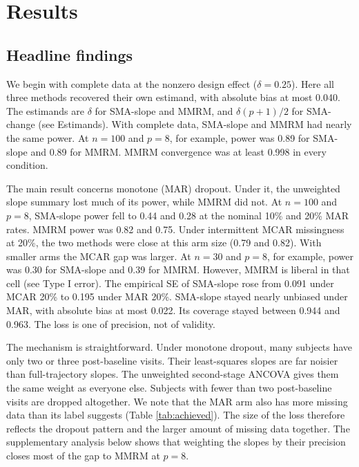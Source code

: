 \documentclass[
  11pt,
]{article}
\begin{document}
\section{Results}\label{results}

\subsection{Headline findings}\label{headline-findings}

We begin with complete data at the nonzero design effect
(\(\delta = 0.25\)). Here all three methods recovered their own
estimand, with absolute bias at most
0.040. The estimands
are \(\delta\) for SMA-slope and MMRM, and \(\delta (p+1)/2\) for
SMA-change (see Estimands). With complete data, SMA-slope and
MMRM had nearly the same power. At \(n = 100\) and \(p = 8\), for
example, power was 0.89 for SMA-slope and
0.89 for MMRM. MMRM convergence was at least
0.998 in every condition.

The main result concerns monotone (MAR) dropout. Under it, the
unweighted slope summary lost much of its power, while MMRM
did not. At \(n = 100\) and \(p = 8\), SMA-slope power fell to
0.44 and 0.28
at the nominal 10\% and 20\% MAR rates. MMRM power was
0.82 and 0.75. Under
intermittent MCAR missingness at 20\%, the two methods were
close at this arm size (0.79 and
0.82). With smaller arms the MCAR gap was
larger. At \(n = 30\) and \(p = 8\), for example, power was
0.30 for SMA-slope and 0.39 for MMRM.
However, MMRM is liberal in that cell (see Type I error). The
empirical SE of SMA-slope rose
from 0.091 under MCAR 20\% to
0.195 under MAR 20\%. SMA-slope stayed
nearly unbiased under MAR, with absolute bias at most
0.022. Its coverage
stayed between 0.944 and
0.963. The loss is one of
precision, not of validity.

The mechanism is straightforward. Under monotone dropout, many
subjects have only two or three post-baseline visits. Their
least-squares slopes are far noisier than full-trajectory
slopes. The unweighted second-stage ANCOVA gives them the same
weight as everyone else. Subjects with fewer than two
post-baseline visits are dropped altogether. We note that the
MAR arm also has more missing data than its label suggests
(Table \ref{tab:achieved}). The size of the loss therefore
reflects the dropout pattern and the larger amount of missing
data together. The supplementary analysis below shows that
weighting the slopes by their precision closes most of the
gap to MMRM at \(p = 8\).
\end{document}
